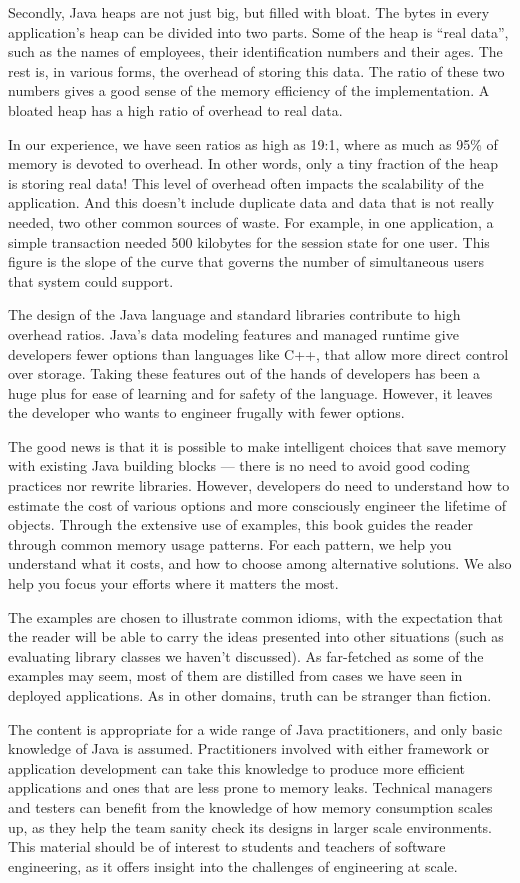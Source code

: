 Secondly, Java heaps
are not just big, but filled with bloat. The bytes in every application's heap can be divided into two
parts. Some of the heap is ``real data'', such as the names of employees, their
identification numbers and their ages. The rest is, in various forms, the
overhead of storing this data. The ratio of these two numbers gives a good sense of the
memory efficiency of the implementation. A bloated heap has a high ratio of
overhead to real data.

In our experience, we have seen ratios as high as 19:1, where as much as 95\%
of memory is devoted to overhead. In other words,
only a tiny fraction of the heap is storing real data! This level of overhead often
impacts the scalability of the application. And this doesn't include duplicate data and data that is not
really needed, two other common sources of waste. For example, in one application, a simple transaction
needed 500 kilobytes for the session state for one user. This
figure is the slope of the curve that governs the number of simultaneous users that system could support.  

The design of the Java language and standard libraries contribute to high
overhead ratios. Java's data modeling features and managed runtime give
developers fewer options than languages like C++, that allow more direct control over
storage. Taking these features out of the hands of developers has been a huge
plus for ease of learning and for safety of the language. However, it leaves the
developer who wants to engineer frugally with fewer options. 

The good news is that it is possible to make intelligent choices that save
memory with existing Java building blocks --- there is no need to avoid good
coding practices nor rewrite libraries. However, developers do need to understand how
to estimate the cost of various options and more consciously engineer the
lifetime of objects. Through the extensive use of examples, this book guides the reader
through common memory usage patterns. For each pattern, we help you understand
what it costs, and how to choose among alternative solutions. We also help you
focus your efforts where it matters the most.

The examples are chosen to illustrate common idioms, with the expectation that
the reader will be able to carry the ideas presented into other situations
(such as evaluating library classes we haven't discussed). As far-fetched as
some of the examples may seem, most of them are distilled from cases we have seen 
in deployed applications. As in other domains, truth can be stranger than
fiction.

The content is appropriate for a wide range of Java practitioners, and only
basic knowledge of Java is assumed.
Practitioners involved with either framework or application development can
take this knowledge to produce more efficient applications and ones that are less prone to memory leaks.
Technical managers and testers can benefit from the knowledge of how memory
consumption scales up, as they help the team sanity check its designs in larger
scale environments. This material should be of interest to students and teachers
of software engineering, as it offers insight into the challenges of engineering 
at scale.

